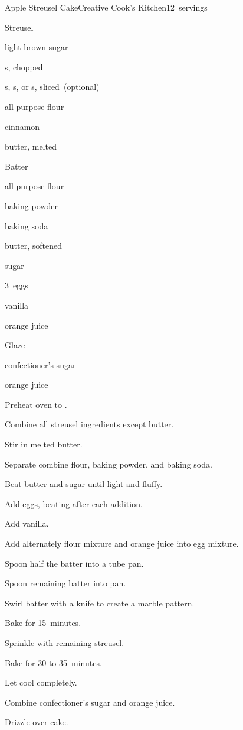 \begin{recipe}{Apple Streusel Cake}{Creative Cook's Kitchen}{12~servings}

Streusel
\begin{ingredients}
\item {} light brown sugar
\item {} s, chopped
\item {} s, s, or s, sliced~(optional)
\item \C{\quarter} all-purpose flour
\item {} cinnamon
\item {} butter, melted
\end{ingredients}

Batter
\begin{ingredients}
\item {} all-purpose flour
\item {} baking powder
\item {} baking soda
\item \C{\half} butter, softened
\item \C{\half} sugar
\item 3~eggs
\item \tp{\half} vanilla
\item \C{\third} orange juice
\end{ingredients}

Glaze
\begin{ingredients}
\item \C{\half} confectioner's sugar
\item \tp{2\half} orange juice
\end{ingredients}

\begin{directions}
\item Preheat oven to .
\item Combine all streusel ingredients except butter.
\item Stir in melted butter.
\item Separate combine flour, baking powder, and baking soda.
\item Beat butter and sugar until light and fluffy.
\item Add eggs, beating after each addition.
\item Add vanilla.
\item Add alternately flour mixture and orange juice into egg mixture.
\item Spoon half the batter into a tube pan.
\item Spoon remaining batter into pan.
\item Swirl batter with a knife to create a marble pattern.
\item Bake for 15~minutes.
\item Sprinkle with remaining streusel.
\item Bake for 30 to 35~minutes.
\item Let cool completely.
\item Combine confectioner's sugar and orange juice.
\item Drizzle over cake.
\end{directions}

\end{recipe}
